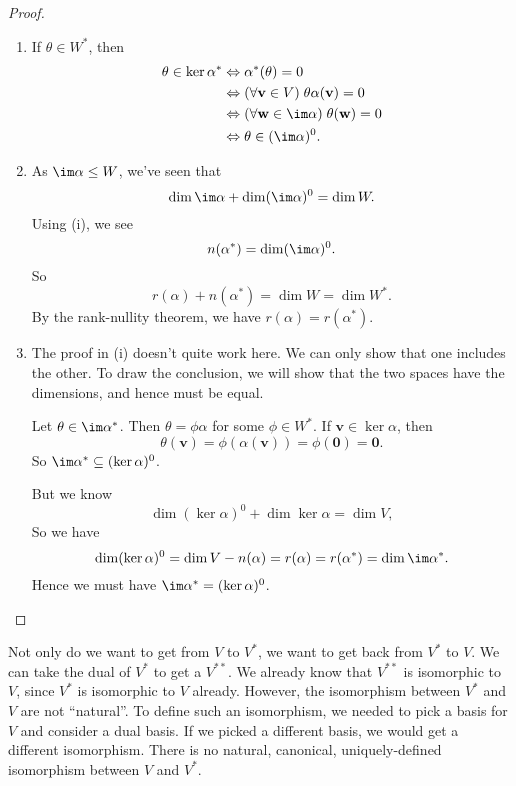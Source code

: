 \documentclass[a4paper]{article}
\begin{document}
\begin{proof}\leavevmode
  \begin{enumerate}
    \item If $\theta \in W^*$, then
      \begin{align*}
        \theta \in \ker \alpha^* &\Leftrightarrow \alpha^*(\theta) = 0 \\
        &\Leftrightarrow (\forall \mathbf{v}\in V)\; \theta \alpha(\mathbf{v}) = 0 \\
        &\Leftrightarrow (\forall \mathbf{w}\in \im \alpha)\; \theta(\mathbf{w}) = 0\\
        &\Leftrightarrow \theta \in (\im \alpha)^0.
      \end{align*}
    \item As $\im \alpha \leq W$, we've seen that
      \[
        \dim \im \alpha + \dim (\im \alpha)^0 = \dim W.
      \]
      Using (i), we see
      \[
        n(\alpha^*) = \dim (\im \alpha)^0.
      \]
      So
      \[
        r(\alpha) + n(\alpha^*) = \dim W = \dim W^*.
      \]
      By the rank-nullity theorem, we have $r(\alpha) = r(\alpha^*)$.
    \item The proof in (i) doesn't quite work here. We can only show that one includes the other. To draw the conclusion, we will show that the two spaces have the dimensions, and hence must be equal.

      Let $\theta \in \im \alpha^*$. Then $\theta = \phi \alpha$ for some $\phi \in W^*$. If $\mathbf{v}\in \ker\alpha$, then
      \[
        \theta(\mathbf{v}) = \phi(\alpha(\mathbf{v})) = \phi(\mathbf{0}) = \mathbf{0}.
      \]
      So $\im \alpha^* \subseteq (\ker\alpha)^0$.

      But we know
      \[
        \dim (\ker \alpha)^0 + \dim \ker \alpha = \dim V,
      \]
      So we have
      \[
        \dim (\ker \alpha)^0 = \dim V - n(\alpha) = r(\alpha) = r(\alpha^*) = \dim \im \alpha^*.
      \]
      Hence we must have $\im \alpha^* = (\ker \alpha)^0$.\qedhere
  \end{enumerate}
\end{proof}

Not only do we want to get from $V$ to $V^*$, we want to get back from $V^*$ to $V$. We can take the dual of $V^*$ to get a $V^{**}$. We already know that $V^{**}$ is isomorphic to $V$, since $V^*$ is isomorphic to $V$ already. However, the isomorphism between $V^*$ and $V$ are not ``natural''. To define such an isomorphism, we needed to pick a basis for $V$ and consider a dual basis. If we picked a different basis, we would get a different isomorphism. There is no natural, canonical, uniquely-defined isomorphism between $V$ and $V^*$.
\end{document}
